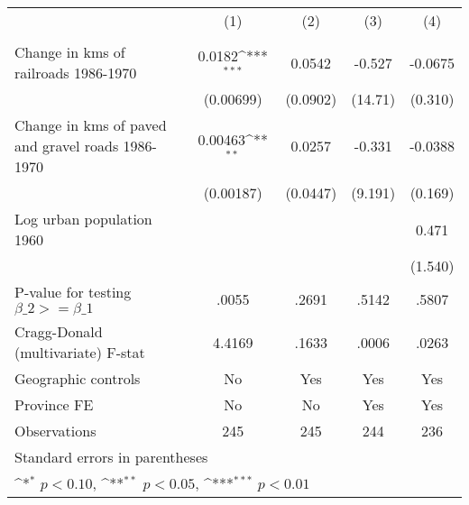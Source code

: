 {
\def\sym#1{\ifmmode^{#1}\else\(^{#1}\)\fi}
\begin{tabular}{l*{4}{c}}
\hline\hline
                &\multicolumn{1}{c}{(1)}&\multicolumn{1}{c}{(2)}&\multicolumn{1}{c}{(3)}&\multicolumn{1}{c}{(4)}\\
                &\multicolumn{1}{c}{}&\multicolumn{1}{c}{}&\multicolumn{1}{c}{}&\multicolumn{1}{c}{}\\
\hline
Change in kms of railroads 1986-1970&   0.0182\sym{***}&   0.0542         &   -0.527         &  -0.0675         \\
                &(0.00699)         & (0.0902)         &  (14.71)         &  (0.310)         \\
[1em]
Change in kms of paved and gravel roads 1986-1970&  0.00463\sym{**} &   0.0257         &   -0.331         &  -0.0388         \\
                &(0.00187)         & (0.0447)         &  (9.191)         &  (0.169)         \\
[1em]
Log urban population 1960&                  &                  &                  &    0.471         \\
                &                  &                  &                  &  (1.540)         \\
\hline
P-value for testing $\beta\_{2} >= \beta\_{1}$&    .0055         &    .2691         &    .5142         &    .5807         \\
Cragg-Donald (multivariate) F-stat&   4.4169         &    .1633         &    .0006         &    .0263         \\
Geographic controls&       No         &      Yes         &      Yes         &      Yes         \\
Province FE     &       No         &       No         &      Yes         &      Yes         \\
Observations    &      245         &      245         &      244         &      236         \\
\hline\hline
\multicolumn{5}{l}{\footnotesize Standard errors in parentheses}\\
\multicolumn{5}{l}{\footnotesize \sym{*} \(p<0.10\), \sym{**} \(p<0.05\), \sym{***} \(p<0.01\)}\\
\end{tabular}
}
